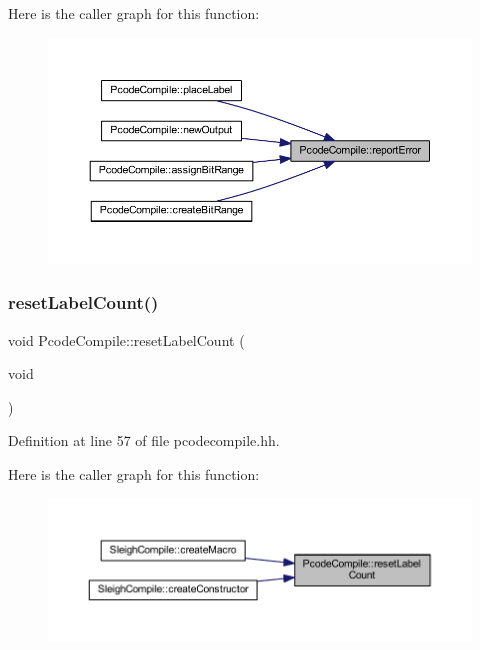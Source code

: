 Here is the caller graph for this function\+:
\nopagebreak
\begin{figure}[H]
\begin{center}
\leavevmode
\includegraphics[width=350pt]{class_pcode_compile_af18d2709e08b84b7cb21fbf1411a9f82_icgraph}
\end{center}
\end{figure}
\mbox{\label{class_pcode_compile_ae395a68b9a0223d0ecbcc02c33c209b6}} 
\subsubsection{\texorpdfstring{resetLabelCount()}{resetLabelCount()}}
{\footnotesize\ttfamily void Pcode\+Compile\+::reset\+Label\+Count (\begin{DoxyParamCaption}\item[{void}]{ }\end{DoxyParamCaption})\hspace{0.3cm}{\ttfamily [inline]}}



Definition at line 57 of file pcodecompile.\+hh.

Here is the caller graph for this function\+:
\nopagebreak
\begin{figure}[H]
\begin{center}
\leavevmode
\includegraphics[width=350pt]{class_pcode_compile_ae395a68b9a0223d0ecbcc02c33c209b6_icgraph}
\end{center}
\end{figure}
\mbox{\label{class_pcode_compile_af7e8818253a38675b526406dde5a4e6e}} 
